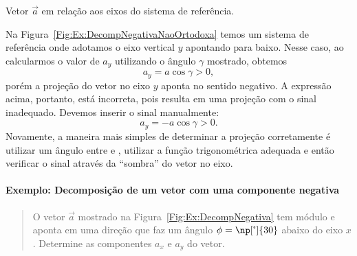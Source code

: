 \begin{marginfigure}
\centering
{}
\caption{Vetor $\vec{a}$ em relação aos eixos do sistema de referência. \label{Fig:Ex:DecompNegativaNaoOrtodoxa}}
\end{marginfigure}

Na Figura~\ref{Fig:Ex:DecompNegativaNaoOrtodoxa} temos um sistema de referência onde adotamos o eixo vertical $y$ apontando para baixo. Nesse caso, ao calcularmos o valor de $a_y$ utilizando o ângulo $\gamma$ mostrado, obtemos
\begin{equation}
    a_y = a \cos\gamma > 0,
\end{equation}
%
porém a projeção do vetor no eixo $y$ aponta no sentido negativo. A expressão acima, portanto, está incorreta, pois resulta em uma projeção com o sinal inadequado. Devemos inserir o sinal manualmente:
\begin{equation}
    a_y = -a \cos\gamma > 0.
\end{equation}
%
Novamente, a maneira mais simples de determinar a projeção corretamente é utilizar um ângulo entre  e , utilizar a função trigonométrica adequada e então verificar o sinal através da ``sombra'' do vetor no eixo.


\paragraph{Exemplo: Decomposição de um vetor com uma componente negativa}

\begin{quote}
    O vetor $\vec{a}$ mostrado na Figura~\ref{Fig:Ex:DecompNegativa} tem módulo  e aponta em uma direção que faz um ângulo $\phi = \np[\tcdegree]{30}$ abaixo do eixo $x$. Determine as componentes $a_x$ e $a_y$ do vetor.
\end{quote}

